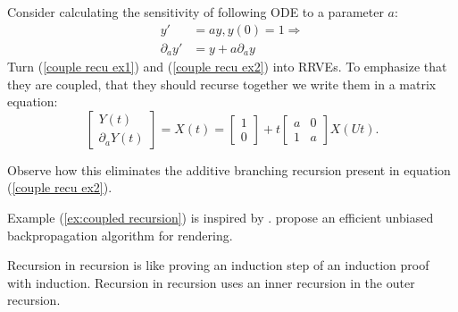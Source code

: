 \documentclass[a4paper,12pt]{article}
\begin{document}
\begin{example} \label{ex:coupled recursion}
    Consider calculating the
    sensitivity of following ODE to a
    parameter $a$:
    \begin{align}
        y'             & =ay,y(0)=1 \Rightarrow \label{couple recu ex1} \\
        \partial_{a}y' & = y + a \partial_{a}y \label{couple recu ex2}
    \end{align}
    Turn (\ref{couple recu ex1}) and (\ref{couple recu ex2}) into RRVEs.
    To emphasize that they are coupled, that they should
    recurse together we write them in a matrix equation:
    \begin{equation} \label{coupled mat}
        \begin{bmatrix}
            Y(t) \\
            \partial_{a}Y(t)
        \end{bmatrix}=
        X(t)=
        \begin{bmatrix}
            1 \\
            0
        \end{bmatrix}+
        t \begin{bmatrix}
            a & 0 \\
            1 & a
        \end{bmatrix}
        X(Ut).
    \end{equation}

    Observe how this eliminates the additive branching recursion
    present in equation (\ref{couple recu ex2}).

\end{example}

\begin{pythonn} 
\end{pythonn}

\begin{related}
    Example (\ref{ex:coupled recursion}) is inspired by \cite{vicini_path_2021}.
    \cite{vicini_path_2021} propose an efficient unbiased backpropagation
    algorithm for rendering.
\end{related}

\begin{technique}\label{tech:recu in recu}
    Recursion in recursion is like proving an induction
    step of an induction proof with induction. Recursion in recursion
    uses an inner recursion in the outer recursion.
\end{technique}
\end{document}
